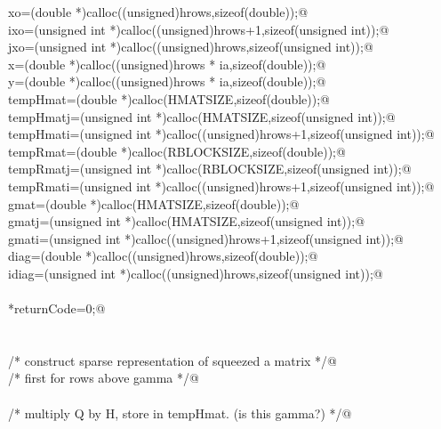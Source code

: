\documentclass[12pt]{article}
\begin{document}
\begin{flushleft}
\begin{minipage}{\linewidth}
\begin{list}{}{}
\mbox{}\verb@        xo=(double *)calloc((unsigned)hrows,sizeof(double));@\\
\mbox{}\verb@        ixo=(unsigned int *)calloc((unsigned)hrows+1,sizeof(unsigned int));@\\
\mbox{}\verb@        jxo=(unsigned int *)calloc((unsigned)hrows,sizeof(unsigned int));@\\
\mbox{}\verb@        x=(double *)calloc((unsigned)hrows * ia,sizeof(double));@\\
\mbox{}\verb@        y=(double *)calloc((unsigned)hrows * ia,sizeof(double));@\\
\mbox{}\verb@        tempHmat=(double *)calloc(HMATSIZE,sizeof(double));@\\
\mbox{}\verb@        tempHmatj=(unsigned int *)calloc(HMATSIZE,sizeof(unsigned int));@\\
\mbox{}\verb@        tempHmati=(unsigned int *)calloc((unsigned)hrows+1,sizeof(unsigned int));@\\
\mbox{}\verb@        tempRmat=(double *)calloc(RBLOCKSIZE,sizeof(double));@\\
\mbox{}\verb@        tempRmatj=(unsigned int *)calloc(RBLOCKSIZE,sizeof(unsigned int));@\\
\mbox{}\verb@        tempRmati=(unsigned int *)calloc((unsigned)hrows+1,sizeof(unsigned int));@\\
\mbox{}\verb@        gmat=(double *)calloc(HMATSIZE,sizeof(double));@\\
\mbox{}\verb@        gmatj=(unsigned int *)calloc(HMATSIZE,sizeof(unsigned int));@\\
\mbox{}\verb@        gmati=(unsigned int *)calloc((unsigned)hrows+1,sizeof(unsigned int));@\\
\mbox{}\verb@        diag=(double *)calloc((unsigned)hrows,sizeof(double));@\\
\mbox{}\verb@        idiag=(unsigned int *)calloc((unsigned)hrows,sizeof(unsigned int));@\\
\mbox{}\verb@@\\
\mbox{}\verb@        *returnCode=0;@\\
\mbox{}\verb@@\\
\mbox{}\verb@@\\
\mbox{}\verb@        /* construct sparse representation of squeezed a matrix */@\\
\mbox{}\verb@        /* first for rows above gamma */@\\
\mbox{}\verb@@\\
\mbox{}\verb@        /* multiply Q by H, store in tempHmat.  (is this gamma?) */@\\

\end{list}
\end{minipage}
\end{flushleft}
\end{document}
